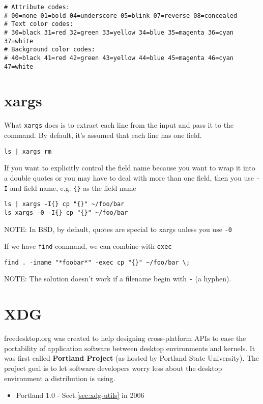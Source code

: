 \begin{verbatim}
# Attribute codes:
# 00=none 01=bold 04=underscore 05=blink 07=reverse 08=concealed
# Text color codes:
# 30=black 31=red 32=green 33=yellow 34=blue 35=magenta 36=cyan 37=white
# Background color codes:
# 40=black 41=red 42=green 43=yellow 44=blue 45=magenta 46=cyan 47=white

\end{verbatim}


\section{xargs}
\label{sec:xargs}

What \verb!xargs! does is to extract each line from the input and pass it to the
command. By default, it's assumed that each line has one field.
\begin{verbatim}
ls | xargs rm
\end{verbatim}

If you want to explicitly control the field name because you want to wrap it
into a double quotes or you may have to deal with more than one field, then you
use \verb!-I! and field name, e.g. \verb!{}! as the field name
\begin{verbatim}
ls | xargs -I{} cp "{}" ~/foo/bar
ls xargs -0 -I{} cp "{}" ~/foo/bar
\end{verbatim}
NOTE: In BSD, by default, quotes are special to xargs unless you use \verb!-0!

If we have \verb!find! command, we can combine with \verb!exec!
\begin{verbatim}
find . -iname "*foobar*" -exec cp "{}" ~/foo/bar \;
\end{verbatim}
NOTE: The solution doesn't work if a filename begin with \verb!-! (a hyphen).


\section{XDG}
\label{sec:XDG}

freedesktop.org was created to help  designing cross-platform APIs to ease the
portability of application software between desktop environments and kernels. It
was first called {\bf Portland Project} (as hosted by Portland State
University).  The project goal is to let software developers worry less about
the desktop environment a distribution is using.
\begin{itemize}
  \item Portland 1.0 - Sect.\ref{sec:xdg-utils} in 2006
\end{itemize}

